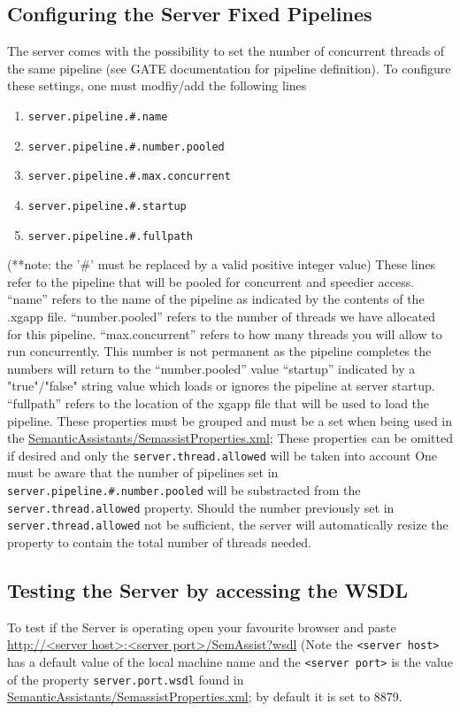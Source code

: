 \subsection{Configuring the Server Fixed Pipelines}
The server comes with the possibility to set the number of concurrent threads
of the same pipeline (see GATE documentation for pipeline definition).  To 
configure these settings, one must modfiy/add the following lines
\begin{enumerate}
\item \texttt{server.pipeline.\#.name}
\item \texttt{server.pipeline.\#.number.pooled}
\item \texttt{server.pipeline.\#.max.concurrent}
\item \texttt{server.pipeline.\#.startup}
\item \texttt{server.pipeline.\#.fullpath}
\end{enumerate}
(**note: the '\#' must be replaced by a valid positive integer value)
These lines refer to the pipeline that will be pooled for concurrent and
speedier access.  
``name'' refers to the name of the pipeline as indicated by the contents of the .xgapp file.
``number.pooled'' refers to the number of threads we have allocated for this pipeline.
``max.concurrent'' refers to how many threads you will allow to run concurrently.  This number is not permanent as the pipeline completes the numbers will return to the ``number.pooled'' value
``startup'' indicated by a "true"/"false" string value which loads or ignores the pipeline at server startup.
``fullpath'' refers to the location of the xgapp file that will be used to load the pipeline.
These properties must be grouped and must be a set when being used in the \url{SemanticAssistants/SemassistProperties.xml};
These properties can be omitted if desired and only the \texttt{server.thread.allowed} will be taken into account
One must be aware that the number of pipelines set in \texttt{server.pipeline.\#.number.pooled}
will be substracted from the \texttt{server.thread.allowed} property.  Should the number previously
set in \texttt{server.thread.allowed} not be sufficient, the server will automatically resize the property
to contain the total number of threads needed.

\subsection{Testing the Server by accessing the WSDL}
To test if the Server is operating open your favourite browser and
paste \url{http://<server host>:<server port>/SemAssist?wsdl} (Note
the \texttt{<server host>} has a default value of the local machine
name and the \texttt{<server port>} is the value of the property
\texttt{server.port.wsdl} found in
\url{SemanticAssistants/SemassistProperties.xml}; by default it is set
to 8879.

